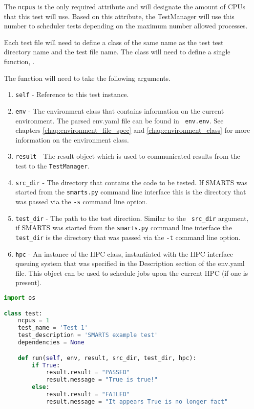 
The {\tt ncpus} is the only required attribute and will designate the amount of
CPUs that this test will use. Based on this attribute, the TestManager will
use this number to scheduler tests depending on the maximum number allowed
processes.

Each test file will need to define a class of the same name as the test
test directory name and the test file name. The class will need to define a
single function, \run.

The \run function will need to take the following arguments.

\begin{enumerate}
    \item {\tt self} - Reference to this test instance.
    \item {\tt env} - The environment class that contains information on the
    current environment. The parsed env.yaml file can be found in {\tt
    env.env}. See chapters \ref{chap:environment_file_spec} and
    \ref{chap:environment_class} for more information on the environment class.
    \item {\tt result} - The result object which is used to communicated
    results from the test to the {\tt TestManager}.
    \item {\tt src\_dir} - The directory that contains the code to be tested. If
    SMARTS was started from the {\tt smarts.py} command line interface this is
    the directory that was passed via the {\tt -s} command line option. 
    \item {\tt test\_dir} - The path to the test direction. Similar to the {\tt
    src\_dir} argument, if SMARTS was started from the {\tt smarts.py} command
    line interface the {\tt test\_dir} is the directory that was passed via the
    {\tt -t} command line option.
    \item {\tt hpc} - An instance of the HPC class, instantiated with the HPC
    interface queuing system that was specified in the Description section of
    the env.yaml file. This object can be used to schedule jobs upon the
    current HPC (if one is present).
\end{enumerate}


\begin{lstlisting}[language=Python, 
                   caption={Example test1.py},
                   label={lst:example_test}]
import os

class test:
    ncpus = 1
    test_name = 'Test 1'
    test_description = 'SMARTS example test'
    dependencies = None

    def run(self, env, result, src_dir, test_dir, hpc):
        if True:
            result.result = "PASSED"
            result.message = "True is true!"
        else:
            result.result = "FAILED"
            result.message = "It appears True is no longer fact"
\end{lstlisting}


